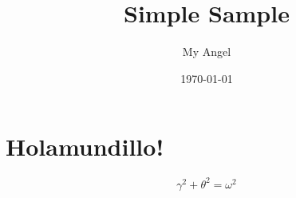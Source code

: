 \documentclass{article} %
\title{Simple Sample} %
\author{My Angel} %
\date{\today} %
\begin{document}
\maketitle %

\section{Holamundillo!} %


\begin{equation} %
  \gamma^2+\theta^2=\omega^2
\end{equation}
\end{document}

